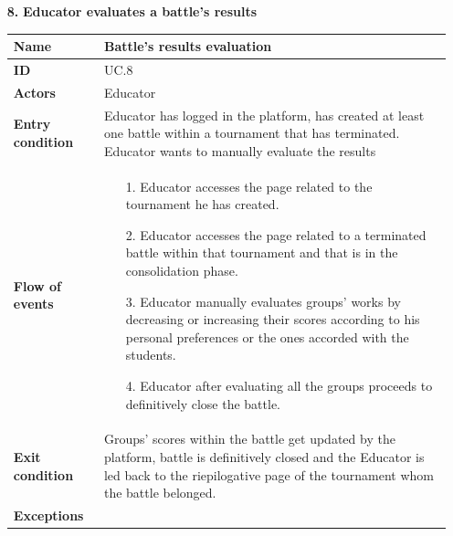 \documentclass{article}
\begin{document}
{\begin{enumerate}
    \newpage
    \item[\textbf{8.}] \textbf{Educator evaluates a battle's results}
          \begin{xltabular}{\textwidth}
              {| >{\raggedright\arraybackslash}g | >{\raggedright\arraybackslash}X |}
              \hline
              \endfirsthead
              \hline
              \endhead
              \endfoot
              \hline
              \endlastfoot




              \textbf{Name} & Battle's results evaluation\\
              \hline
              \textbf{ID} & UC.8\\
              \hline
              \textbf{Actors} & Educator\\
              \hline
              \textbf{Entry condition} & Educator has logged in the platform, has created at least one battle
              within a tournament that has terminated. Educator wants to manually evaluate the results\\
              \hline
              \textbf{Flow of events} &    \begin{enumerate}
                  \item[1.] Educator accesses the page related to the tournament
                        he has created.
                  \item[2.] Educator accesses the page related to a terminated
                        battle within that tournament and that is in the consolidation phase.
                  \item[3.] Educator manually evaluates groups' works by decreasing or
                        increasing their scores according to his personal preferences or
                        the ones accorded with the students.
                  \item[4.] Educator after evaluating all the groups proceeds to
                        definitively close the battle.
              \end{enumerate} \\
              \hline
              \textbf{Exit condition} & Groups' scores within the battle get updated by the platform,
              battle is definitively closed and the Educator is led back to the riepilogative page of
              the tournament whom the battle belonged.\\
              \hline
              \textbf{Exceptions} &    \begin{itemize}

\end{itemize}
\end{xltabular}
\end{enumerate}}
\end{document}

